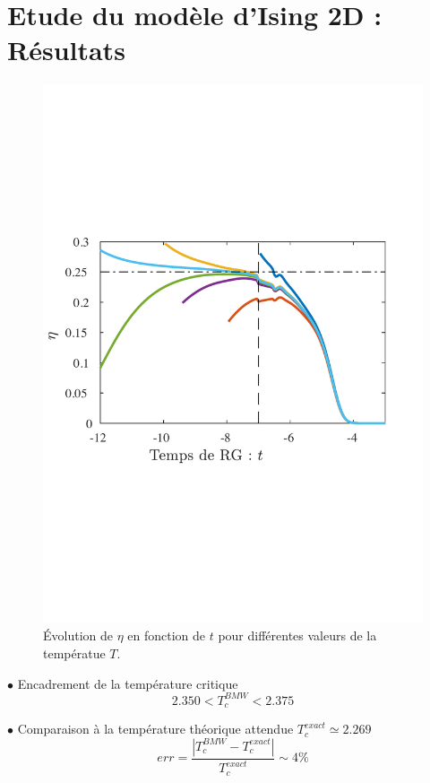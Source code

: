 \documentclass[9pt]{beamer}
\begin{document}
		\section{Etude du modèle d'Ising 2D : Résultats}
		\sommaire{}
		\begin{frame}
	\justifying
	\vspace*{22pt}
	
	\begin{figure}[H]
\begin{center}
	\includegraphics[scale=0.3]{MesuRes2.pdf}
\end{center}
\caption{Évolution de $\eta$ en fonction de $t$ pour différentes valeurs de la températue $T$.}
\label{fig:etaMesu}
\end{figure}

$\bullet$ Encadrement de la température critique
\begin{equation}
2.350  < T_c^{BMW}  < 2.375 
\end{equation}

$\bullet $ Comparaison à la température théorique attendue $T_c^{exact} \simeq 2.269$
\begin{equation}
	err = \frac{ |T_c^{BMW} - T_c^{exact}|}{T_c^{exact}} \sim 4 \%
\end{equation}



	
	\end{frame}
\end{document}
